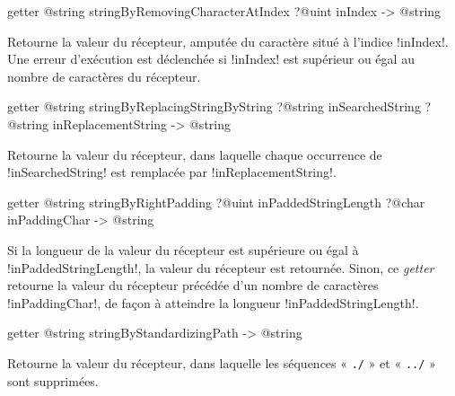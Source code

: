 \begin{galgas3box}
getter @string stringByRemovingCharacterAtIndex ?@uint inIndex -> @string
\end{galgas3box}

Retourne la valeur du récepteur, amputée du caractère situé à l'indice \ggst!inIndex!. Une erreur d'exécution est déclenchée si \ggst!inIndex! est supérieur ou égal au nombre de caractères du récepteur.








\begin{galgas3box}
getter @string stringByReplacingStringByString
     ?@string inSearchedString
     ?@string inReplacementString  -> @string
\end{galgas3box}

Retourne la valeur du récepteur, dans laquelle chaque occurrence de \ggst!inSearchedString! est remplacée par \ggst!inReplacementString!.








\begin{galgas3box}
getter @string stringByRightPadding
   ?@uint inPaddedStringLength
   ?@char inPaddingChar -> @string
\end{galgas3box}

Si la longueur de la valeur du récepteur est supérieure ou égal à \ggst!inPaddedStringLength!, la valeur du récepteur est retournée. Sinon, ce \emph{getter} retourne la valeur du récepteur précédée d'un nombre de caractères \ggst!inPaddingChar!, de façon à atteindre la longueur \ggst!inPaddedStringLength!.





\begin{galgas3box}
getter @string stringByStandardizingPath -> @string
\end{galgas3box}

Retourne la valeur du récepteur, dans laquelle les séquences « \texttt{./} » et « \texttt{../} » sont supprimées.







